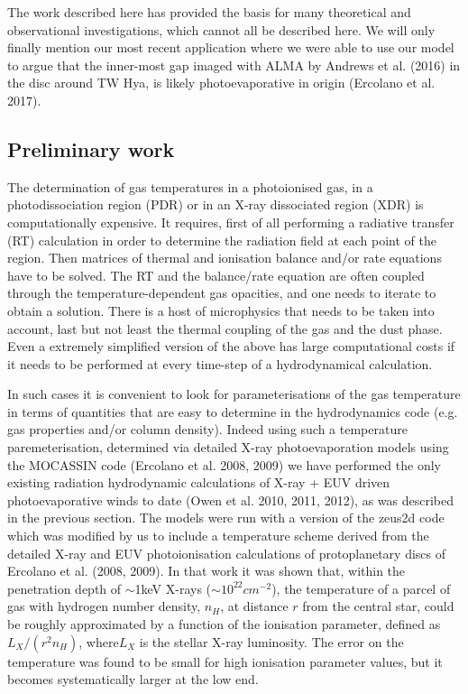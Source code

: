 \documentclass[10pt,fleqn,twoside]{article}
\begin{document}
The work described here has provided the basis for many theoretical
and observational investigations, which cannot all be described
here. We will only finally mention our most recent application where
we were able to use our model to argue that the inner-most gap imaged
with ALMA by Andrews et al. (2016) in the disc around TW Hya, is
likely photoevaporative in origin (Ercolano et al. 2017). 

\subsection{Preliminary work}

The determination of gas temperatures in a photoionised gas, in a
photodissociation region (PDR) or in an X-ray dissociated region (XDR)
is computationally expensive. It requires, first of all 
performing a radiative transfer (RT) calculation in order to determine the
radiation field at each point of the region. Then matrices of thermal and
ionisation balance and/or rate equations have to be solved. The RT and
the balance/rate equation are often coupled through the
temperature-dependent gas opacities, and one needs to iterate to
obtain a solution. There is a host of microphysics
that needs to be taken into account, last but not least the thermal
coupling of the gas and the dust phase. Even a extremely simplified
version of the above has large computational costs if it needs to be performed at
every time-step of a hydrodynamical calculation. 

In such cases it is convenient to look for parameterisations of the
gas temperature in terms of quantities that are easy to determine in
the hydrodynamics code (e.g. gas properties and/or column density). 
Indeed using such a temperature paremeterisation,
determined via detailed X-ray photoevaporation models using the
MOCASSIN code (Ercolano et al. 2008, 2009) we have performed the
only existing radiation hydrodynamic 
calculations of X-ray + EUV driven photoevaporative winds to date (Owen et
al. 2010, 2011, 2012), as was described in the previous section. The models were run with a version of the {\sc
  zeus2d} code which was modified by us to include a temperature
scheme derived from the detailed X-ray and EUV photoionisation
calculations of protoplanetary discs of Ercolano et al. (2008,
2009). In that work it was shown that, within the
penetration depth of $\sim$1keV X-rays ($\sim 10^{22}cm^{-2}$), the
temperature of a parcel of gas with hydrogen number density, $n_H$, at
distance $r$ from the central star, could be roughly approximated by a
function of the ionisation parameter, defined as $L_X/(r^2 n_H)$,
where$L_X$ is the stellar X-ray luminosity. The error on the
temperature was found to be small for high ionisation parameter values, but it
becomes systematically larger at the low end. 
\end{document}
